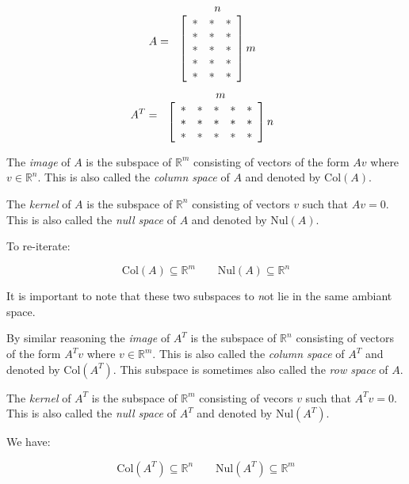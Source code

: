 \documentclass[11pt]{article}
\begin{document}
\[ A =
\begin{array}{c@{\,}c@{\,}c}
  & n & \\
 &
\left[
\begin{array}{ccc}
 * & *  & *  \\
 * & *  & *  \\
  * & *  & *  \\
   * & *  & *  \\
    * & *  & *  
\end{array}
\right] m
\end{array}
\]
\[
 A^T =
\begin{array}{c@{\,}c@{\,}c}
  & m & \\
 &
\left[
\begin{array}{ccccc}
 *   &  * & * & * & * \\
*   &  * & * & * & * \\
*   &  * & * & * & * 
\end{array}
\right] n
\end{array}
\]

The \emph{image} of $A$ is the subspace of $\mathbb{R}^m$ consisting of vectors of the form $Av$ where $v \in \mathbb{R}^n$. This is also called the \emph{column space} of $A$ and denoted by $\mathrm{Col}(A)$.

The \emph{kernel} of $A$ is the subspace of $\mathbb{R}^n$ consisting of vectors $v$ such that $Av = 0$. This is also called the \emph{null space} of $A$ and denoted by $\mathrm{Nul}(A)$.

To re-iterate:

\[ \mathrm{Col}(A) \subseteq \mathbb{R}^m   \qquad
\mathrm{Nul}(A) \subseteq \mathbb{R}^n
\]

It is important to note that these two subspaces to {\emph not} lie in the same ambiant space. 

By similar reasoning the \emph{image} of $A^T$ is the subspace of $\mathbb{R}^n$ consisting of vectors of the form $A^Tv$ where $v \in \mathbb{R}^m$. This is also called the \emph{column space} of $A^T$ and denoted by $\mathrm{Col}(A^T)$. This subspace is sometimes also called the \emph{row space} of $A$.

The \emph{kernel} of $A^T$ is the subspace of $\mathbb{R}^m$ consisting of vecors $v$ such that $A^Tv = 0$. This is also called the \emph{null space} of $A^T$ and denoted by $\mathrm{Nul}(A^T)$. 

We have:

\[ \mathrm{Col}(A^T) \subseteq \mathbb{R}^n   \qquad
\mathrm{Nul}(A^T) \subseteq \mathbb{R}^m
\]
\end{document}
